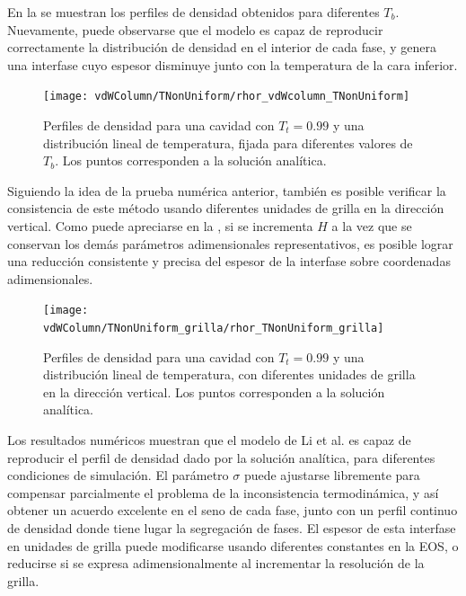 En la  se muestran los perfiles de densidad obtenidos para diferentes $T_b$. Nuevamente, puede observarse que el modelo \pp{} es capaz de reproducir correctamente la distribuci\'on de densidad en el interior de cada fase, y genera una interfase cuyo espesor disminuye junto con la temperatura de la cara inferior.

\begin{figure}[ht]
	\centering
	\texttt{[image: vdWColumn/TNonUniform/rhor\_vdWcolumn\_TNonUniform]}
	\caption{Perfiles de densidad para una cavidad con $T_t = 0.99$ y una distribuci\'on lineal de temperatura, fijada para diferentes valores de $T_b$. Los puntos corresponden a la soluci\'on anal\'itica.}
	\label{fig:vdWColumn_rhor_TNonUniform}
\end{figure}

Siguiendo la idea de la prueba num\'erica anterior, tambi\'en es posible verificar la consistencia de este m\'etodo \pp{} usando diferentes unidades de grilla en la direcci\'on vertical. Como puede apreciarse en la , si se incrementa $H$ a la vez que se conservan los dem\'as par\'ametros adimensionales representativos, es posible lograr una reducci\'on consistente y precisa del espesor de la interfase sobre coordenadas adimensionales.

\begin{figure}[ht]
	\centering
	\texttt{[image: vdWColumn/TNonUniform\_grilla/rhor\_TNonUniform\_grilla]}
	\caption{Perfiles de densidad para una cavidad con $T_t = 0.99$ y una distribuci\'on lineal de temperatura, con diferentes unidades de grilla en la direcci\'on vertical. Los puntos corresponden a la soluci\'on anal\'itica.}
	\label{fig:vdWColumn_TNonUniform_grilla}
\end{figure}


Los resultados num\'ericos muestran que el modelo \pp{} de Li et al. es capaz de reproducir el perfil de densidad dado por la soluci\'on anal\'itica, para diferentes condiciones de simulaci\'on. El par\'ametro $\sigma$ puede ajustarse libremente para compensar parcialmente el problema de la inconsistencia termodin\'amica, y as\'i obtener un acuerdo excelente en el seno de cada fase, junto con un perfil continuo de densidad donde tiene lugar la segregaci\'on de fases. El espesor de esta interfase en unidades de grilla puede modificarse usando diferentes constantes en la EOS, o reducirse si se expresa adimensionalmente al incrementar la resoluci\'on de la grilla.

